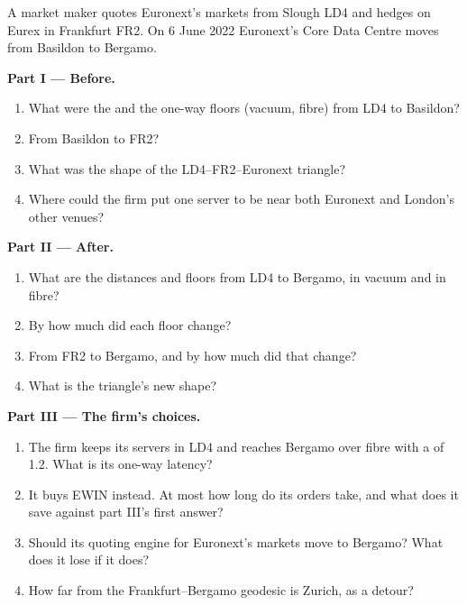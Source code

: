 \begin{problem}\label{pb:nw:the-european-map:1}
A market maker quotes Euronext's markets from Slough LD4 and hedges on Eurex in Frankfurt FR2. On 6 June 2022 Euronext's Core Data Centre moves
from Basildon to Bergamo.

\medskip\noindent\textbf{Part I --- Before.}
\begin{enumerate}
\item What were the  and the one-way floors (vacuum, fibre) from LD4 to Basildon?
\item From Basildon to FR2?
\item What was the shape of the LD4--FR2--Euronext triangle?
\item Where could the firm put one server to be near both Euronext and London's other venues?
\end{enumerate}

\medskip\noindent\textbf{Part II --- After.}
\begin{enumerate}[resume]
\item What are the distances and floors from LD4 to Bergamo, in vacuum and in fibre?
\item By how much did each floor change?
\item From FR2 to Bergamo, and by how much did that change?
\item What is the triangle's new shape?
\end{enumerate}

\medskip\noindent\textbf{Part III --- The firm's choices.}
\begin{enumerate}[resume]
\item The firm keeps its servers in LD4 and reaches Bergamo over fibre with a  of 1.2. What is its one-way latency?
\item It buys EWIN instead. At most how long do its orders take, and what does it save against part III's first answer?
\item Should its quoting engine for Euronext's markets move to Bergamo? What does it lose if it does?
\item How far from the Frankfurt--Bergamo geodesic is Zurich, as a detour?
\end{enumerate}


\end{problem}
